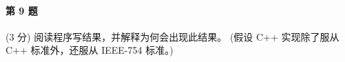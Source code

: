 \paragraph{第 9 题} (3 分) 阅读程序写结果，并解释为何会出现此结果。
(假设 C++ 实现除了服从 C++ 标准外，还服从 IEEE-754 标准。)



\quad \\[1cm]
